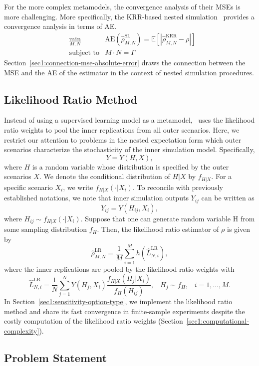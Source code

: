For the more complex metamodels, the convergence analysis of their MSEs is more challenging.
More specifically, the KRR-based nested simulation~\citep{wang2022smooth} provides a convergence analysis in terms of AE.
\begin{align} \label{eq1:ae}
    & \min_{M, N}  & \text{AE}(\hat{\rho}^{\text{SL}}_{M, N}) = \mathbb{E} \left[ \left| \hat{\rho}^{\text{KRR}}_{M, N} - \rho \right| \right] \nonumber \\
    & \text{subject to} & M \cdot N = \Gamma 
\end{align}
Section~\ref{sec1:connection-mse-absolute-error} draws the connection between the MSE and the AE of the estimator in the context of nested simulation procedures.

\subsection{Likelihood Ratio Method}

Instead of using a supervised learning model as a metamodel,~\cite{zhang2022sample} uses the likelihood ratio weights to pool the inner replications from all outer scenarios.
Here, we restrict our attention to problems in the nested expectation form which outer scenarios characterize the stochasticity of the inner simulation model. 
Specifically,
$$ Y = Y(H, X), $$
where $H$ is a random variable whose distribution is specified by the outer scenarios $X$. 
We denote the conditional distribution of $H|X$ by $f_{H|X}$. 
For a specific scenario $X_i$, we write $f_{H|X}(\cdot |X_i)$. 
To reconcile with previously established notations, we note that inner simulation outputs $Y_{ij}$ can be written as
$$ Y_{ij} = Y(H_{ij}, X_i), $$
where $H_{ij} \sim f_{H|X}(\cdot |X_i)$.
Suppose that one can generate random variable H from some sampling
distribution $f_H$. Then, the likelihood ratio estimator of $\rho$ is given by
$$\hat{\rho}^{\text{LR}}_{M,N} = \frac{1}{M} \sum_{i=1}^M h(\hat{L}^{\text{LR}}_{N, i}), $$ where the inner replications are pooled by the likelihood ratio weights with
$$\hat{L}^{\text{LR}}_{N, i} = \frac{1}{N} \sum_{j=1}^N Y(H_j, X_i) \frac{f_{H|X}(H_{j}|X_i)}{f_H(H_{ij})}, \;\;\; H_j \sim f_H, \;\;\; i=1, \dots, M.$$
In Section~\ref{sec1:sensitivity-option-type}, we implement the likelihood ratio method and share its fast convergence in finite-sample experiments despite the costly computation of the likelihood ratio weights (Section~\ref{sec1:computational-complexity}).

\subsection{Problem Statement}

